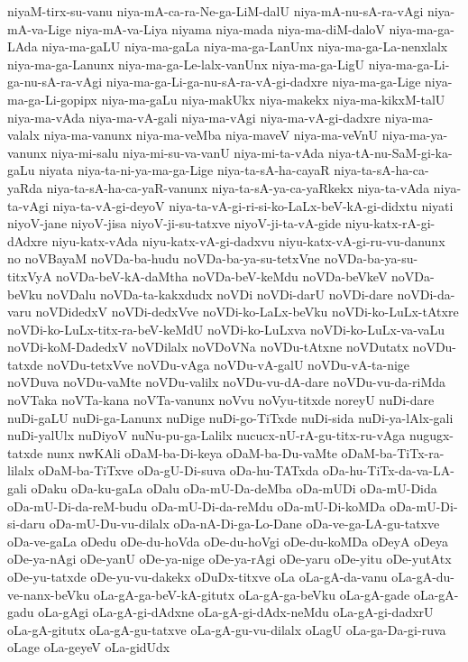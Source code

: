 {niyaM-tirx-su-vanu
niya-mA-ca-ra-Ne-ga-LiM-dalU
niya-mA-nu-sA-ra-vAgi
niya-mA-va-Lige
niya-mA-va-Liya
niyama
niya-mada
niya-ma-diM-daloV
niya-ma-ga-LAda
niya-ma-gaLU
niya-ma-gaLa
niya-ma-ga-LanUnx
niya-ma-ga-La-nenxlalx
niya-ma-ga-Lanunx
niya-ma-ga-Le-lalx-vanUnx
niya-ma-ga-LigU
niya-ma-ga-Li-ga-nu-sA-ra-vAgi
niya-ma-ga-Li-ga-nu-sA-ra-vA-gi-dadxre
niya-ma-ga-Lige
niya-ma-ga-Li-gopipx
niya-ma-gaLu
niya-makUkx
niya-makekx
niya-ma-kikxM-talU
niya-ma-vAda
niya-ma-vA-gali
niya-ma-vAgi
niya-ma-vA-gi-dadxre
niya-ma-valalx
niya-ma-vanunx
niya-ma-veMba
niya-maveV
niya-ma-veVnU
niya-ma-ya-vanunx
niya-mi-salu
niya-mi-su-va-vanU
niya-mi-ta-vAda
niya-tA-nu-SaM-gi-ka-gaLu
niyata
niya-ta-ni-ya-ma-ga-Lige
niya-ta-sA-ha-cayaR
niya-ta-sA-ha-ca-yaRda
niya-ta-sA-ha-ca-yaR-vanunx
niya-ta-sA-ya-ca-yaRkekx
niya-ta-vAda
niya-ta-vAgi
niya-ta-vA-gi-deyoV
niya-ta-vA-gi-ri-si-ko-LaLx-beV-kA-gi-didxtu
niyati
niyoV-jane
niyoV-jisa
niyoV-ji-su-tatxve
niyoV-ji-ta-vA-gide
niyu-katx-rA-gi-dAdxre
niyu-katx-vAda
niyu-katx-vA-gi-dadxvu
niyu-katx-vA-gi-ru-vu-danunx
no
noVBayaM
noVDa-ba-hudu
noVDa-ba-ya-su-tetxVne
noVDa-ba-ya-su-titxVyA
noVDa-beV-kA-daMtha
noVDa-beV-keMdu
noVDa-beVkeV
noVDa-beVku
noVDalu
noVDa-ta-kakxdudx
noVDi
noVDi-darU
noVDi-dare
noVDi-da-varu
noVDidedxV
noVDi-dedxVve
noVDi-ko-LaLx-beVku
noVDi-ko-LuLx-tAtxre
noVDi-ko-LuLx-titx-ra-beV-keMdU
noVDi-ko-LuLxva
noVDi-ko-LuLx-va-vaLu
noVDi-koM-DadedxV
noVDilalx
noVDoVNa
noVDu-tAtxne
noVDutatx
noVDu-tatxde
noVDu-tetxVve
noVDu-vAga
noVDu-vA-galU
noVDu-vA-ta-nige
noVDuva
noVDu-vaMte
noVDu-valilx
noVDu-vu-dA-dare
noVDu-vu-da-riMda
noVTaka
noVTa-kana
noVTa-vanunx
noVvu
noVyu-titxde
noreyU
nuDi-dare
nuDi-gaLU
nuDi-ga-Lanunx
nuDige
nuDi-go-TiTxde
nuDi-sida
nuDi-ya-lAlx-gali
nuDi-yalUlx
nuDiyoV
nuNu-pu-ga-Lalilx
nucucx-nU-rA-gu-titx-ru-vAga
nugugx-tatxde
nunx
nwKAli
oDaM-ba-Di-keya
oDaM-ba-Du-vaMte
oDaM-ba-TiTx-ra-lilalx
oDaM-ba-TiTxve
oDa-gU-Di-suva
oDa-hu-TATxda
oDa-hu-TiTx-da-va-LA-gali
oDaku
oDa-ku-gaLa
oDalu
oDa-mU-Da-deMba
oDa-mUDi
oDa-mU-Dida
oDa-mU-Di-da-reM-budu
oDa-mU-Di-da-reMdu
oDa-mU-Di-koMDa
oDa-mU-Di-si-daru
oDa-mU-Du-vu-dilalx
oDa-nA-Di-ga-Lo-Dane
oDa-ve-ga-LA-gu-tatxve
oDa-ve-gaLa
oDedu
oDe-du-hoVda
oDe-du-hoVgi
oDe-du-koMDa
oDeyA
oDeya
oDe-ya-nAgi
oDe-yanU
oDe-ya-nige
oDe-ya-rAgi
oDe-yaru
oDe-yitu
oDe-yutAtx
oDe-yu-tatxde
oDe-yu-vu-dakekx
oDuDx-titxve
oLa
oLa-gA-da-vanu
oLa-gA-du-ve-nanx-beVku
oLa-gA-ga-beV-kA-gitutx
oLa-gA-ga-beVku
oLa-gA-gade
oLa-gA-gadu
oLa-gAgi
oLa-gA-gi-dAdxne
oLa-gA-gi-dAdx-neMdu
oLa-gA-gi-dadxrU
oLa-gA-gitutx
oLa-gA-gu-tatxve
oLa-gA-gu-vu-dilalx
oLagU
oLa-ga-Da-gi-ruva
oLage
oLa-geyeV
oLa-gidUdx
}
